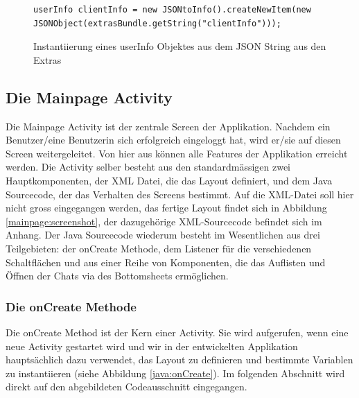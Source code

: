 \documentclass[a4paper,11pt]{report}
\begin{document}
\begin{figure}
	\begin{center}
		\begin{verbatim}
userInfo clientInfo = new JSONtoInfo().createNewItem(new JSONObject(extrasBundle.getString("clientInfo")));
		\end{verbatim}
	\caption{Instantiierung eines userInfo Objektes aus dem JSON String aus den Extras}\label{java:instanzUserInfo}
	\end{center}

\end{figure}

			\subsection{Die Mainpage Activity}
			Die Mainpage Activity ist der zentrale Screen der Applikation. Nachdem ein Benutzer/eine Benutzerin sich erfolgreich eingeloggt hat, wird er/sie auf diesen Screen weitergeleitet. Von hier aus können alle Features der Applikation erreicht werden. Die Activity selber besteht aus den standardmässigen zwei Hauptkomponenten, der XML Datei, die das Layout definiert, und dem Java Sourcecode, der das Verhalten des Screens bestimmt. Auf die XML-Datei soll hier nicht gross eingegangen werden, das fertige Layout findet sich in Abbildung \ref{mainpage:screenshot}, der dazugehörige XML-Sourcecode befindet sich im Anhang. Der Java Sourcecode wiederum besteht im Wesentlichen aus drei Teilgebieten: der onCreate Methode, dem Listener für die verschiedenen Schaltflächen und aus einer Reihe von Komponenten, die das Auflisten und Öffnen der Chats via des Bottomsheets ermöglichen.
			
			\subsubsection{Die onCreate Methode}
			Die onCreate Method ist der Kern einer Activity. Sie wird aufgerufen, wenn eine neue Activity gestartet wird und wir in der entwickelten Applikation hauptsächlich dazu verwendet, das Layout zu definieren und bestimmte Variablen zu instantiieren (siehe Abbildung \ref{java:onCreate}). Im folgenden Abschnitt wird direkt auf den abgebildeten Codeausschnitt eingegangen.
			
\end{document}
